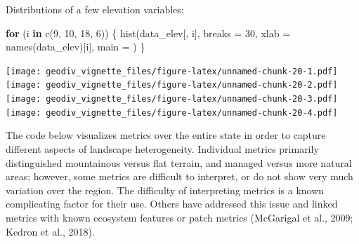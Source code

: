 \documentclass[
]{article}
\newenvironment{Shaded}{\begin{snugshade}}{\end{snugshade}}
\newcommand{\AttributeTok}[1]{\textcolor[rgb]{0.77,0.63,0.00}{#1}}
\newcommand{\ControlFlowTok}[1]{\textcolor[rgb]{0.13,0.29,0.53}{\textbf{#1}}}
\newcommand{\DecValTok}[1]{\textcolor[rgb]{0.00,0.00,0.81}{#1}}
\newcommand{\FunctionTok}[1]{\textcolor[rgb]{0.00,0.00,0.00}{#1}}
\newcommand{\NormalTok}[1]{#1}
\newcommand{\StringTok}[1]{\textcolor[rgb]{0.31,0.60,0.02}{#1}}
\begin{document}
Distributions of a few elevation variables:

\begin{Shaded}
\begin{Highlighting}[]
\ControlFlowTok{for}\NormalTok{ (i }\ControlFlowTok{in} \FunctionTok{c}\NormalTok{(}\DecValTok{9}\NormalTok{, }\DecValTok{10}\NormalTok{, }\DecValTok{18}\NormalTok{, }\DecValTok{6}\NormalTok{)) \{}
  \FunctionTok{hist}\NormalTok{(data\_elev[, i], }\AttributeTok{breaks =} \DecValTok{30}\NormalTok{, }\AttributeTok{xlab =} \FunctionTok{names}\NormalTok{(data\_elev)[i], }\AttributeTok{main =} \StringTok{\textquotesingle{}\textquotesingle{}}\NormalTok{)}
\NormalTok{\}}
\end{Highlighting}
\end{Shaded}

\texttt{[image: geodiv\_vignette\_files/figure-latex/unnamed-chunk-20-1.pdf]}
\texttt{[image: geodiv\_vignette\_files/figure-latex/unnamed-chunk-20-2.pdf]}
\texttt{[image: geodiv\_vignette\_files/figure-latex/unnamed-chunk-20-3.pdf]}
\texttt{[image: geodiv\_vignette\_files/figure-latex/unnamed-chunk-20-4.pdf]}

The code below visualizes metrics over the entire state in order to
capture different aspects of landscape heterogeneity. Individual metrics
primarily distinguished mountainous versus flat terrain, and managed
versus more natural areas; however, some metrics are difficult to
interpret, or do not show very much variation over the region. The
difficulty of interpreting metrics is a known complicating factor for
their use. Others have addressed this issue and linked metrics with
known ecosystem features or patch metrics (McGarigal et al., 2009;
Kedron et al., 2018).
\end{document}
